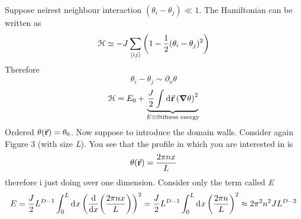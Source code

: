 \documentclass[../main/main.tex]{subfiles}
\begin{document}
Suppose neirest neighbour interaction \( (\theta _i - \theta _j) \ll 1 \). The Hamiltonian can be written as
\begin{equation}
  \mathcal{H} \simeq - J \sum_{\expval{ij} }^{} \qty(1- \frac{1}{2}(\theta _i - \theta _j)^2)
\end{equation}
Therefore
\begin{equation}
  \theta _i - \theta _j \sim \partial_x{\theta }
\end{equation}
\begin{equation}
  \mathcal{H} = E_0 + \underbrace{\frac{J}{2} \int_{}^{} \dd[]{\va{r}} \qty(\grad \theta )^2 }_{E \equiv \text{Stifness energy}}
\end{equation}
Ordered \( \theta (\va{r}) = \theta _0 \). Now suppose to introduce the domain walls. Consider again Figure 3 (with size \emph{L}). You see that the profile in which you are interested in is
\begin{equation}
  \theta (\va{r}) = \frac{2 \pi n x}{L}
\end{equation}
therefore i just doing over one dimension. Consider only the term called \emph{E}
\begin{equation}
  E = \frac{J}{2} L^{D-1} \int_{0}^{L} \dd[]{x} \qty(\dv{}{x} \qty(\frac{2 \pi n x}{L})  )^2 = \frac{J}{2} L^{D-1} \int_{0}^{L} \dd[]{x} \qty(\frac{2 \pi n}{L})^2 \approx 2 \pi ^2 n^2 J L^{D-2}      
\end{equation}
\end{document}
